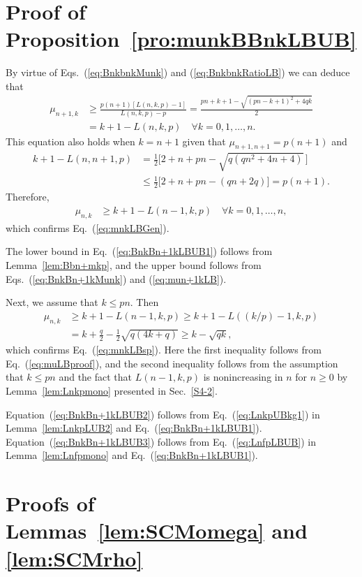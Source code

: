 \documentclass[aop]{imsart}
\theoremstyle{plain}
\theoremstyle{remark}
\newcommand{\1}{\operatorname{\uppercase\expandafter{\romannumeral1}}}
\newcommand{\2}{\operatorname{\uppercase\expandafter{\romannumeral2}}}
\newcommand{\3}{\operatorname{\uppercase\expandafter{\romannumeral3}}}
\newcommand{\4}{\operatorname{\uppercase\expandafter{\romannumeral4}}}
\newcommand{\5}{\operatorname{\uppercase\expandafter{\romannumeral5}}}
\newcommand{\6}{\operatorname{\uppercase\expandafter{\romannumeral6}}}
\newcommand{\7}{\operatorname{\uppercase\expandafter{\romannumeral7}}}
\newcommand{\8}{\operatorname{\uppercase\expandafter{\romannumeral8}}}
\newcommand{\9}{\operatorname{\uppercase\expandafter{\romannumeral9}}}
\newcommand{\eref}[1]{Eq.~\textup{(\ref{#1})}}
\newcommand{\Eref}[1]{Equation~\textup{(\ref{#1})}}
\newcommand{\eqsref}[2]{Eqs.~(\ref{#1}) and (\ref{#2})}
\newcommand{\lref}[1]{Lemma~\ref{#1}}
\newcommand{\lsref}[1]{Lemmas~\ref{#1}}
\newcommand{\pref}[1]{Proposition~\ref{#1}}
\newcommand{\sref}[1]{Sec.~\ref{#1}}
\begin{document}
\begin{appendix}
\section{\label{app:munkBBnkLBUB}Proof of \pref{pro:munkBBnkLBUB}}
By virtue of \eqsref{eq:BnkbnkMunk}{eq:BnkbnkRatioLB} we can deduce that
\begin{align}\label{eq:mun+1kLB}
\mu_{n+1,k}&\geq \frac{p(n+1)[L(n,k,p)-1]}{L(n,k,p)-p}=\frac{p n+k+1-\sqrt{(p n-k+1)^2+4q k}}{2}\\
&=k+1-L(n,k,p) \quad \forall k=0,1,\ldots, n.  \nonumber
\end{align}
This equation also holds when $k=n+1$ given that $\mu_{n+1,n+1}=p(n+1)$ and
\begin{align}
k+1-L(n,n+1,p)&= \frac{1}{2}\bigl[2+n+p n-\sqrt{q (q n^2+4n+4)}\,\bigr]\\
&\leq  \frac{1}{2}\bigl[2+n+p n-(q n+2q)\bigr]=p(n+1). \nonumber
\end{align}
Therefore, 
\begin{align}\label{eq:muLBproof}
\mu_{n,k}&\geq k+1-L(n-1,k,p)\quad \forall k=0,1,\ldots, n,
\end{align}
which confirms \eref{eq:mnkLBGen}. 


The lower bound in \eref{eq:BnkBn+1kLBUB1} follows from \lref{lem:Bbn+mkp}, and the upper bound follows from \eqsref{eq:BnkBn+1kMunk}{eq:mun+1kLB}.



Next, we assume that $k\leq pn$.  Then 
\begin{align}
\mu_{n,k}&\geq k+1-L(n-1,k,p)\geq k+1-L((k/p)-1,k,p)\\
&=k+\frac{q}{2}-\frac{1}{2}\sqrt{q (4k+q )}\geq k-\sqrt{q k},\nonumber
\end{align}
which confirms \eref{eq:mnkLBsp}. Here the first inequality follows from \eref{eq:muLBproof}, and the second inequality follows from the assumption that  $k\leq pn$ and the fact that $L(n-1,k,p)$ is nonincreasing in $n$ for $n\geq 0$ by \lref{lem:Lnkpmono} 
presented in \sref{S4-2}.

\Eref{eq:BnkBn+1kLBUB2} follows from \eref{eq:LnkpUBkg1} in \lref{lem:LnkpLUB2} and \eref{eq:BnkBn+1kLBUB1}.
\Eref{eq:BnkBn+1kLBUB3} follows from
\eref{eq:LnfpLBUB} in \lref{lem:Lnfpmono} and \eref{eq:BnkBn+1kLBUB1}.





\section{\label{app:SCM}Proofs of \lsref{lem:SCMomega} and \ref{lem:SCMrho}}


\end{appendix}
\end{document}

